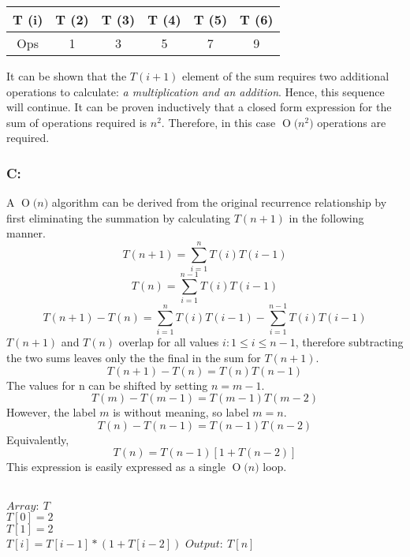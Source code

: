 \documentclass[12pt]{article}
\newcommand{\BigO}[1]{\ensuremath{\operatorname{O}\bigl(#1\bigr)}}
\begin{document}
\begin{center}
    \begin{tabular}{c| c c c c c}
    T (i) & T (2) & T (3) & T (4) & T (5) & T (6) \\ \hline  
    Ops & 1 & 3 & 5 & 7 & 9 \\
    \end{tabular}
\end{center}
It can be shown that the $T(i+1)$ element of the sum requires two additional
operations to calculate: \textit{a multiplication and an addition}.  Hence,
this sequence will continue.  It can be proven inductively that a closed
form expression for the sum of operations required is $n^2$.  Therefore,
in this case \BigO{n^2} operations are required. 

\subsubsection*{C:}
A \BigO{n} algorithm can be derived from the original recurrence
relationship by first eliminating the summation by calculating
$T(n+1)$ in the following manner.
\[
T(n+1) = \sum_{i=1}^{n}T(i)T(i-1)
\]
\[
T(n) = \sum_{i=1}^{n-1}T(i)T(i-1)
\]
\[
T(n+1) - T(n) = \sum_{i=1}^{n}T(i)T(i-1) - \sum_{i=1}^{n-1}T(i)T(i-1)  
\]
$T(n+1)$ and $T(n)$ overlap for all values $i:1\leq i\leq n-1$, therefore
subtracting the two sums leaves only the the final in the sum for $T(n+1)$.
\[
T(n+1) - T(n) = T(n)T(n-1)
\] 
The values for n can be shifted by setting $n = m-1$.
\[
T(m) - T(m-1) = T(m-1)T(m-2)
\]
However, the label $m$ is without meaning, so label $m=n$.
\[
T(n) - T(n-1) = T(n-1)T(n-2)
\]
Equivalently,
\[
T(n) = T(n-1)[1+T(n-2)]
\]
This expression is easily expressed as a single \BigO{n} loop.\\\\
\begin{algorithm}[H]
$Array:\ T$\\
$T[0] = 2$\\
$T[1] = 2$\\
{$T[i] = T[i-1]*(1+T[i-2])$}
$Output:\ T[n]$
\end{algorithm}
\end{document}
